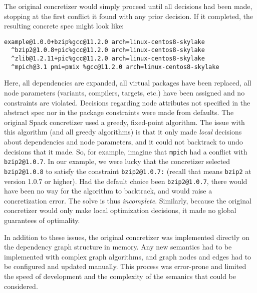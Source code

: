 The original concretizer would simply proceed until all decisions had been made,
stopping at the first conflict it found with any prior decision. If it completed, the
resulting concrete spec might look like:

\begin{verbatim}
example@1.0.0+bzip%gcc@11.2.0 arch=linux-centos8-skylake
  ^bzip2@1.0.8+pic%gcc@11.2.0 arch=linux-centos8-skylake
  ^zlib@1.2.11+pic%gcc@11.2.0 arch=linux-centos8-skylake
  ^mpich@3.1 pmi=pmix %gcc@11.2.0 arch=linux-centos8-skylake
\end{verbatim}

Here, all dependencies are expanded, all virtual packages have been replaced, all node parameters (variants,
compilers, targets, etc.) have been assigned and no constraints are
violated. Decisions regarding node attributes not specified in the abstract spec
nor in the package constraints were made from defaults. The original
Spack concretizer used a greedy, fixed-point algorithm. The issue with
this algorithm (and all greedy algorithms) is that it only made {\it
  local} decisions about dependencies and node parameters, and it
could not backtrack to undo decisions that it made. So, for example,
imagine that {\tt mpich} had a conflict with {\tt bzip2@1.0.7}. In our
example, we were lucky that the concretizer selected {\tt bzip2@1.0.8} to satisfy
the constraint {\tt bzip2@1.0.7:} (recall that means \texttt{bzip2} at version 1.0.7
or higher). Had the default choice been {\tt bzip2@1.0.7}, there would have been no
way for the algorithm to backtrack, and \spack would raise a concretization error. The solve is thus {\it incomplete}. Similarly, because the
original concretizer would only make local optimization decisions, it
made no global guarantees of optimality.


In addition to these issues, the original concretizer was implemented directly on the
dependency graph structure in memory. Any new semantics had to be implemented with
complex graph algorithms, and graph nodes and edges had to be configured and updated
manually. This process was error-prone and limited the speed of development and the
complexity of the semanics that could be considered.
